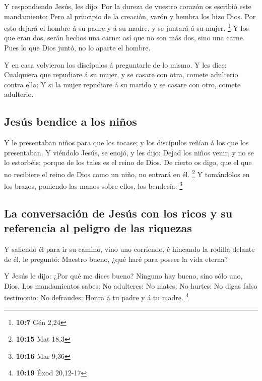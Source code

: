  Y respondiendo Jesús, les dijo: Por la dureza de vuestro
corazón os escribió este mandamiento;  Pero al principio de
la creación, varón y hembra los hizo Dios.  Por esto dejará
el hombre á su padre y á su madre, y se juntará á su mujer. \footnote{\textbf{10:7}
  Gén 2,24}  Y los que eran dos, serán hechos una carne: así
que no son más dos, sino una carne.  Pues lo que Dios juntó,
no lo aparte el hombre.

 Y en casa volvieron los discípulos á preguntarle de lo
mismo.  Y les dice: Cualquiera que repudiare á su mujer, y
se casare con otra, comete adulterio contra ella:  Y si la
mujer repudiare á su marido y se casare con otro, comete adulterio.

\hypertarget{jesuxfas-bendice-a-los-niuxf1os}{%
\subsection{Jesús bendice a los
niños}\label{jesuxfas-bendice-a-los-niuxf1os}}

 Y le presentaban niños para que los tocase; y los
discípulos reñían á los que los presentaban.  Y viéndolo
Jesús, se enojó, y les dijo: Dejad los niños venir, y no se lo
estorbéis; porque de los tales es el reino de Dios.  De
cierto os digo, que el que no recibiere el reino de Dios como un niño,
no entrará en él. \footnote{\textbf{10:15} Mat 18,3}  Y
tomándolos en los brazos, poniendo las manos sobre ellos, los bendecía.
\footnote{\textbf{10:16} Mar 9,36}

\hypertarget{la-conversaciuxf3n-de-jesuxfas-con-los-ricos-y-su-referencia-al-peligro-de-las-riquezas}{%
\subsection{La conversación de Jesús con los ricos y su referencia al
peligro de las
riquezas}\label{la-conversaciuxf3n-de-jesuxfas-con-los-ricos-y-su-referencia-al-peligro-de-las-riquezas}}

 Y saliendo él para ir su camino, vino uno corriendo, é
hincando la rodilla delante de él, le preguntó: Maestro bueno, ¿qué haré
para poseer la vida eterna?

 Y Jesús le dijo: ¿Por qué me dices bueno? Ninguno hay
bueno, sino sólo uno, Dios.  Los mandamientos sabes: No
adulteres: No mates: No hurtes: No digas falso testimonio: No defraudes:
Honra á tu padre y á tu madre. \footnote{\textbf{10:19} Éxod 20,12-17}

